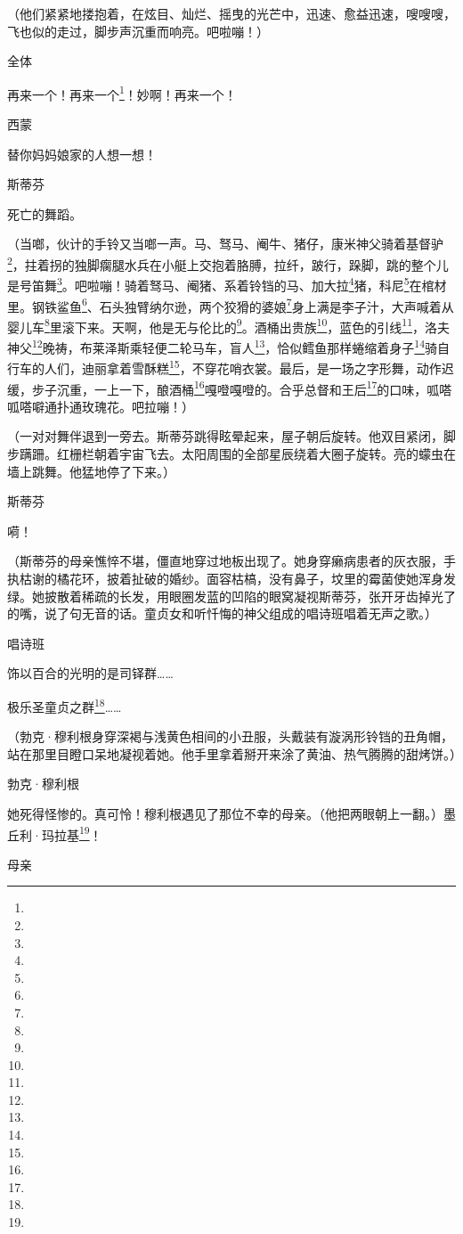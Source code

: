 \par （他们紧紧地搂抱着，在炫目、灿烂、摇曳的光芒中，迅速、愈益迅速，嗖嗖嗖，飞也似的走过，脚步声沉重而响亮。吧啦嘣！）
\par 全体
\par 再来一个！再来一个\footnote{}！妙啊！再来一个！
\par 西蒙
\par 替你妈妈娘家的人想一想！
\par 斯蒂芬
\par 死亡的舞蹈。
\par （当啷，伙计的手铃又当啷一声。马、驽马、阉牛、猪仔，康米神父骑着基督驴\footnote{}，拄着拐的独脚瘸腿水兵在小艇上交抱着胳膊，拉纤，跛行，跺脚，跳的整个儿是号笛舞\footnote{}。吧啦嘣！骑着驽马、阉猪、系着铃铛的马、加大拉\footnote{}猪，科尼\footnote{}在棺材里。钢铁鲨鱼\footnote{}、石头独臂纳尔逊，两个狡猾的婆娘\footnote{}身上满是李子汁，大声喊着从婴儿车\footnote{}里滚下来。天啊，他是无与伦比的\footnote{}。酒桶出贵族\footnote{}，蓝色的引线\footnote{}，洛夫神父\footnote{}晚祷，布莱泽斯乘轻便二轮马车，盲人\footnote{}，恰似鳕鱼那样蜷缩着身子\footnote{}骑自行车的人们，迪丽拿着雪酥糕\footnote{}，不穿花哨衣裳。最后，是一场之字形舞，动作迟缓，步子沉重，一上一下，酿酒桶\footnote{}嘎噔嘎噔的。合乎总督和王后\footnote{}的口味，呱嗒呱嗒噼通扑通玫瑰花。吧拉嘣！）
\par （一对对舞伴退到一旁去。斯蒂芬跳得眩晕起来，屋子朝后旋转。他双目紧闭，脚步蹒跚。红栅栏朝着宇宙飞去。太阳周围的全部星辰绕着大圈子旋转。亮的蠓虫在墙上跳舞。他猛地停了下来。）
\par 斯蒂芬
\par 嗬！
\par （斯蒂芬的母亲憔悴不堪，僵直地穿过地板出现了。她身穿癞病患者的灰衣服，手执枯谢的橘花环，披着扯破的婚纱。面容枯槁，没有鼻子，坟里的霉菌使她浑身发绿。她披散着稀疏的长发，用眼圈发蓝的凹陷的眼窝凝视斯蒂芬，张开牙齿掉光了的嘴，说了句无音的话。童贞女和听忏悔的神父组成的唱诗班唱着无声之歌。）
\par 唱诗班
\par 饰以百合的光明的是司铎群……
\par 极乐圣童贞之群\footnote{}……
\par （勃克·穆利根身穿深褐与浅黄色相间的小丑服，头戴装有漩涡形铃铛的丑角帽，站在那里目瞪口呆地凝视着她。他手里拿着掰开来涂了黄油、热气腾腾的甜烤饼。）
\par 勃克·穆利根
\par 她死得怪惨的。真可怜！穆利根遇见了那位不幸的母亲。（他把两眼朝上一翻。）墨丘利·玛拉基\footnote{}！
\par 母亲
